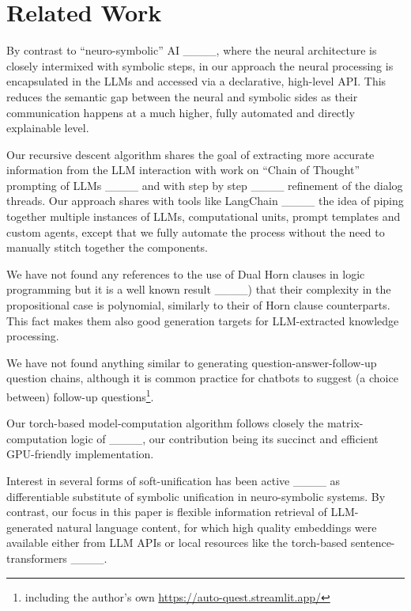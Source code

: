 \section{Related Work}
\label{rel}


By contrast to ``neuro-symbolic'' AI ____, where the neural architecture is closely intermixed with symbolic steps, in our approach the neural processing is encapsulated in the LLMs and accessed via a declarative, high-level API. This reduces the semantic gap between the neural and symbolic sides as their communication happens at a much higher, fully automated and directly explainable level.


Our recursive descent algorithm shares the goal of extracting more accurate information from the LLM interaction with work on ``Chain of Thought'' prompting of LLMs ____ and with step by step ____ refinement of the dialog threads. 
Our approach shares with tools like LangChain ____ the idea of piping together multiple instances of LLMs, computational units, prompt templates and custom agents, except that we fully automate the process without the need to manually stitch together the components.

We have not found any references to the use of Dual Horn clauses in logic programming but it is a well known result ____) that their complexity in the propositional case is polynomial, similarly to their of Horn clause counterparts. This fact makes them also good generation targets for LLM-extracted knowledge processing. 

We have not found anything similar to generating question-answer-follow-up question chains, although it is common practice for chatbots to  suggest (a choice between) follow-up questions\footnote{ including the author's own \url{https://auto-quest.streamlit.app/}}.

Our torch-based model-computation algorithm follows closely the matrix-computation logic of ____, our contribution being its succinct and efficient GPU-friendly implementation.

Interest in several forms of soft-unification has been active  ____ as differentiable substitute of symbolic unification in neuro-symbolic systems.
By contrast, our focus in this paper is flexible information retrieval of LLM-generated natural language content, for which high quality embeddings were available either from LLM APIs or local resources like the torch-based sentence-transformers ____.